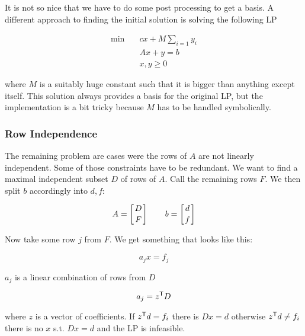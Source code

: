 It is not so nice that we have to do some post processing to get a basis. A different approach to finding the initial solution is solving the following LP

\begin{align*}
\min \quad & cx + M\sum_{i=1} y_i\\
&Ax+y=b\\
&x,y\geq 0
\end{align*}

where $M$ is a suitably huge constant such that it is bigger than anything except itself. This solution always provides a basis for the original LP, but the implementation is a bit tricky because $M$ has to be handled symbolically.

\subsubsection*{Row Independence}

The remaining problem are cases were the rows of $A$ are not linearly independent. Some of those constraints have to be redundant. We want to find a maximal independent subset $D$ of rows of $A$. Call the remaining rows $F$. We then split $b$ accordingly into $d,f$:

\[A=\left[ D \atop F\right] \qquad b = \left[d\atop f\right]\]

Now take some row $j$ from $F$. We get something that looks like this:

\[a_jx=f_j\]

$a_j$ is a linear combination of rows from $D$

\[a_j={z}^\text{\upshape \sffamily T} D\]

where $z$ is a vector of coefficients. If ${z}^\text{\upshape \sffamily T} d = f_i$ there is $Dx=d$ otherwise ${z}^\text{\upshape \sffamily T} d \neq f_i$ there is no $x$ s.t. $Dx=d$ and the LP is infeasible.